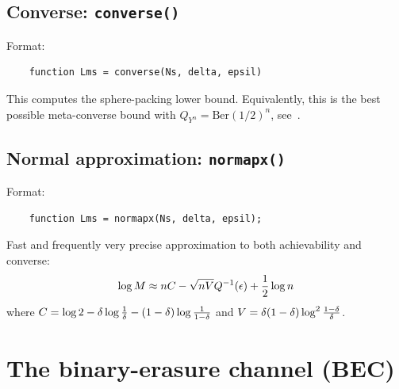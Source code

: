 \documentclass[a4paper,11p]{memoir}
\begin{document}
\section{Converse: \texttt{converse()}}
Format:
\begin{verbatim}
	function Lms = converse(Ns, delta, epsil)
\end{verbatim}

This computes the sphere-packing lower bound. Equivalently, this is the best possible meta-converse bound with $Q_{Y^n}
= \mathrm{Ber}(1/2)^n$, see~\cite[Theorem 35]{PPV08}. 


\section{Normal approximation: \texttt{normapx()}}

Format:
\begin{verbatim}
	function Lms = normapx(Ns, delta, epsil);
\end{verbatim}

Fast and frequently very precise approximation to both achievability and converse:
	$$ \log M \approx n C - \sqrt{nV} Q^{-1}(\epsilon) + {1\over2} \log n $$
where $C=\log 2-\delta \log {1\over \delta} - (1-\delta) \log {1\over 1-\delta}$ and $V=\delta(1-\delta) \log^2
{1-\delta\over \delta}$.



\chapter{The binary-erasure channel (BEC)}
\end{document}
